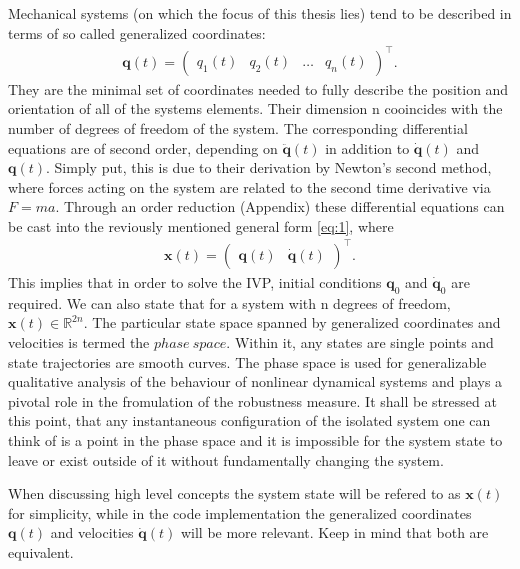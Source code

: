     Mechanical systems (on which the focus of this thesis lies) tend to be described in terms of so called generalized coordinates: \begin{gather}\mathbf{q}(t)=\begin{pmatrix}q_1(t)&q_2(t)&\ldots&q_n(t) \end{pmatrix}^\intercal . \end{gather} They are the minimal set of coordinates needed to fully describe the position and orientation of all of the systems elements. Their dimension n cooincides with the number of degrees of freedom of the system. The corresponding differential equations are of second order, depending on $\ddot{\mathbf{q}}(t)$ in addition to $\dot{\mathbf{q}}(t)$ and $\mathbf{q}(t)$. Simply put, this is due to their derivation by Newton's second method, where forces acting on the system are related to the second time derivative via $F = ma$.
    Through an order reduction (Appendix) these differential equations can be cast into the reviously mentioned general form \ref{eq:1}, where \begin{gather*} \mathbf{x}(t) = \begin{pmatrix}\mathbf{q}(t)&\dot{\mathbf{q}}(t)\end{pmatrix}^\intercal .\end{gather*}
    This implies that in order to solve the IVP, initial conditions $\mathbf{q}_0$ and $\dot{\mathbf{q}}_0$ are required. We can also state that for a system with n degrees of freedom, $\mathbf{x}(t) \in \mathbb{R}^{2n}$. The particular state space spanned by generalized coordinates and velocities is termed the $phase\ space$. Within it, any states are single points and state trajectories are smooth curves. The phase space is used for generalizable qualitative analysis of the behaviour of nonlinear dynamical systems and plays a pivotal role in the fromulation of the robustness measure. It shall be stressed at this point, that any instantaneous configuration of the isolated system one can think of is a point in the phase space and it is impossible for the system state to leave or exist outside of it without fundamentally changing the system. 

    When discussing high level concepts the system state will be refered to as $\mathbf{x}(t)$ for simplicity, while in the code implementation the generalized coordinates $\mathbf{q}(t)$ and velocities $\dot{\mathbf{q}}(t)$ will be more relevant. Keep in mind that both are equivalent.




